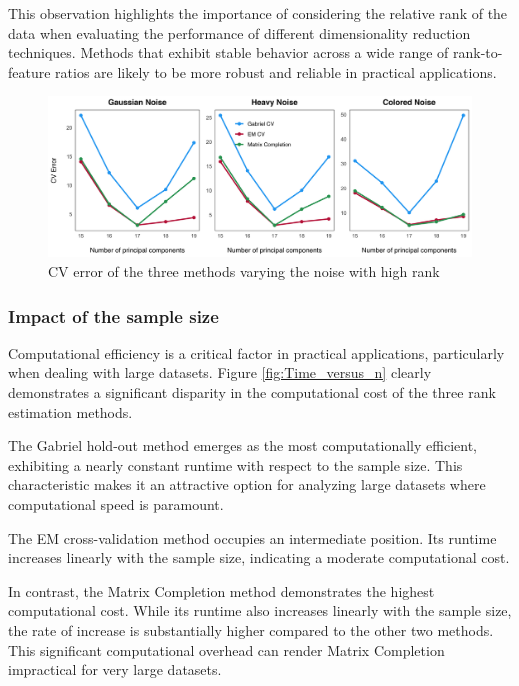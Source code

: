 \documentclass{article}
\begin{document}
This observation highlights the importance of considering the relative rank of the data when evaluating the performance of different dimensionality reduction techniques. Methods that exhibit stable behavior across a wide range of rank-to-feature ratios are likely to be more robust and reliable in practical applications.
\begin{figure}[h!]
    \centering
    \includegraphics[width=\textwidth]{accuracy_high_rank.png}
    \caption{CV error of the three methods varying the noise with high rank}
    \label{fig:Higher_rank}
\end{figure}
\vspace{-5mm}
\subsubsection{Impact of the sample size}

Computational efficiency is a critical factor in practical applications, particularly when dealing with 
large datasets. Figure \ref{fig:Time_versus_n} clearly demonstrates a significant disparity in the 
computational cost of the three rank estimation methods.

The Gabriel hold-out method emerges as the most computationally efficient, exhibiting a nearly constant 
runtime with respect to the sample size. This characteristic makes it an attractive option for analyzing 
large datasets where computational speed is paramount.

The EM cross-validation method occupies an intermediate position. Its runtime increases linearly with the 
sample size, indicating a moderate computational cost.

In contrast, the Matrix Completion method demonstrates the highest computational cost. While its runtime 
also increases linearly with the sample size, the rate of increase is substantially higher compared to the 
other two methods. This significant computational overhead can render Matrix Completion impractical for very 
large datasets.
\end{document}
